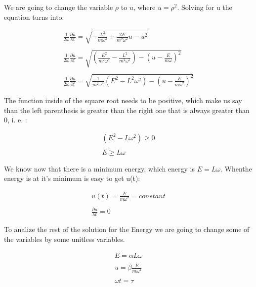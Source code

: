 We are going to change the variable $\rho$ to $u$, where $u=\rho^2$. Solving for u the equation turns into:

\begin{equation}
  \begin{array}{c}
    \frac{1}{2\omega}\frac{\partial u}{\partial t} = \sqrt{- \frac{L^2}{m \omega^2}+ \frac{2E}{m^2\omega^2}u -u^2}
    \\

    \\
    \frac{1}{2\omega}\frac{\partial u}{\partial t} = \sqrt{\left(\frac{E^2}{m^2\omega^4} - \frac{L^2}{m^2\omega^2}\right)-\left(u-\frac{E}{m\omega}\right)^2}
    \\

    \\
    \frac{1}{2\omega}\frac{\partial u}{\partial t} = \sqrt{\frac{1}{m^2\omega^4}\left(E^2-L^2\omega^2\right)-\left(u-\frac{E}{m\omega^2}\right)^2}
  \end{array}
\end{equation}

The function inside of the square root needs to be positive, which make us say than the left parenthesis is greater than the right one that is always greater than 0, i. e. :

\begin{equation}
  \begin{array}{c}
    (E^2-L\omega^2) \geq 0
    \\

    \\
    E \geq L\omega
  \end{array}
\end{equation}

We know now that there is a minimum energy, which energy is $E=L\omega$. Whenthe energy is at it's minimum is easy to get u(t):

\begin{equation}
  \begin{array}{c}
    u(t) = \frac{E}{m\omega^2} = constant
    \\

    \\
    \frac{\partial u}{\partial t} = 0
  \end{array}
\end{equation}

To analize the rest of the solution for the Energy we are going to change some of the variables by some unitless variables.

\begin{equation}
  \label{8.8}
  \begin{array}{c}
    E = \alpha L \omega
    \\

    \\
    u = \beta \frac{E}{m\omega^2}
    \\

    \\
    \omega t = \tau
  \end{array}
\end{equation}

